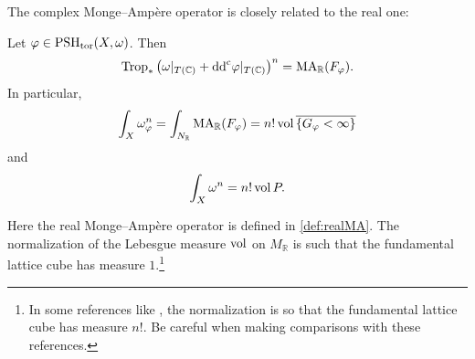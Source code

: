 The complex Monge--Ampère operator is closely related to the real one:
\begin{proposition}\label{prop:toricMAandrealMA}
    Let $\varphi\in \mathrm{PSH}_{\mathrm{tor}}(X,\omega)$. Then
    \begin{equation}\label{eq:tropMAmea}
    \operatorname{Trop}_* \left(\omega|_{T(\mathbb{C})}+\mathrm{dd}^{\mathrm{c}}\varphi|_{T(\mathbb{C})} \right)^n=\operatorname{MA}_{\mathbb{R}}(F_{\varphi}).
    \end{equation}
    In particular,
    \[
        \int_X \omega_{\varphi}^n =\int_{N_{\mathbb{R}}}\operatorname{MA}_{\mathbb{R}}(F_{\varphi})=n! \operatorname{vol} \overline{\{G_{\varphi}<\infty\}}
    \]
    and
    \[
        \int_X  \omega^n=n!\operatorname{vol} P.
    \]
\end{proposition}
Here the real Monge--Ampère operator is defined in \cref{def:realMA}. The normalization of the Lebesgue measure $\operatorname{vol}$ on $M_{\mathbb{R}}$ is such that the fundamental lattice cube has measure $1$.\footnote{In some references like \cite{GKZ08}, the normalization is so that the fundamental lattice cube has measure $n!$. Be careful when making comparisons with these references.}
